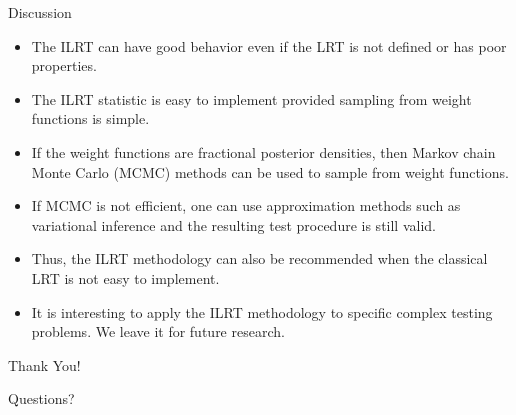 \documentclass{beamer}
\theoremstyle{plain}
\theoremstyle{definition}
\theoremstyle{remark}
\begin{document}
\begin{frame}{Discussion}

\begin{itemize}
    \item
        The ILRT can have good behavior even if the LRT is not defined or has poor properties.
    \item 
The ILRT statistic is easy to implement provided sampling from weight functions is simple.
\item
If the weight functions are fractional posterior densities, then Markov chain Monte Carlo (MCMC) methods can be used to sample from weight functions.
\item
If MCMC is not efficient, one can use approximation methods such as variational inference and the resulting test procedure is still valid.
\item
Thus, the ILRT methodology can also be recommended when the classical LRT is not easy to implement.
\item
It is interesting to apply the ILRT methodology to specific complex testing problems.
We leave it for future research.
\end{itemize}
\end{frame}
\begin{frame}

        \centerline{
            \huge
    Thank You!
}
\vspace{1cm}
        \centerline{
            \huge
            Questions?
}
\end{frame}


\end{document}
